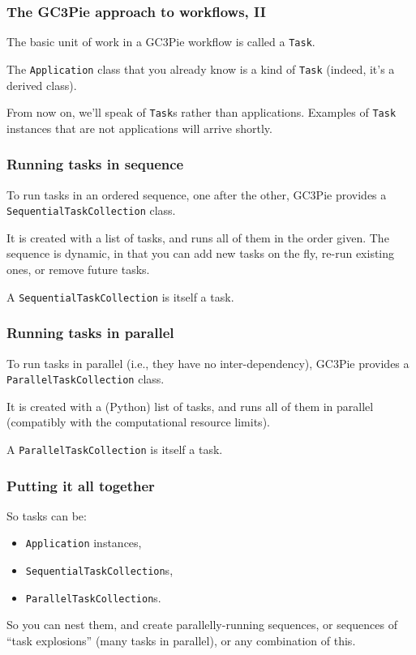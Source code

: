 \documentclass[english,serif,mathserif,xcolor=pdftex,dvipsnames,table]{beamer}
\begin{document}
\begin{frame}
  \frametitle{The GC3Pie approach to workflows, II}

  The basic unit of work in a GC3Pie workflow is called a \texttt{Task}.

  \+
  The \texttt{Application} class that you already know is a kind of
  \texttt{Task} (indeed, it's a derived class).

  \+
  From now on, we'll speak of \texttt{Task}s rather than
  applications.  Examples of \texttt{Task} instances that are not
  applications will arrive shortly.
\end{frame}


\begin{frame}
  \frametitle{Running tasks in sequence}

  To run tasks in an ordered sequence, one after the other, GC3Pie
  provides a \texttt{SequentialTaskCollection} class.

  \+
  It is created with a list of tasks, and runs all of them in the
  order given.  The sequence is dynamic, in that you can add new tasks
  on the fly, re-run existing ones, or remove future tasks.

  \+
  A \texttt{SequentialTaskCollection} is itself a task.
\end{frame}


\begin{frame}
  \frametitle{Running tasks in parallel}

  To run tasks in parallel (i.e., they have no inter-dependency),
  GC3Pie provides a \texttt{ParallelTaskCollection} class.

  \+
  It is created with a (Python) list of tasks, and runs all of them
  in parallel (compatibly with the computational resource limits).

  \+
  A \texttt{ParallelTaskCollection} is itself a task.

\end{frame}


\begin{frame}
  \frametitle{Putting it all together}
  So tasks can be:
  \begin{itemize}
  \item \texttt{Application} instances,
  \item \texttt{SequentialTaskCollection}s,
  \item \texttt{ParallelTaskCollection}s.
  \end{itemize}

  \+
  So you can nest them, and create parallelly-running sequences, or
  sequences of ``task explosions'' (many tasks in parallel), or any
  combination of this.
\end{frame}
\end{document}
